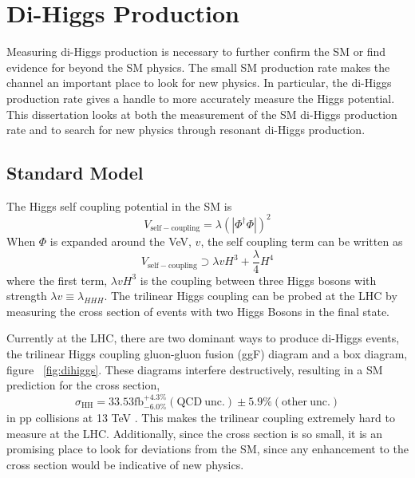\chapter{Di-Higgs Production}
\label{chap:dihiggs}
Measuring di-Higgs production is necessary to further confirm the SM or find evidence for beyond the SM physics. The small SM production rate makes the channel an important place to look for new physics.  In particular, the di-Higgs production rate gives a handle to more accurately measure the Higgs potential.  This dissertation looks at both the measurement of the SM di-Higgs production rate and to search for new physics through resonant di-Higgs production. 
\section{Standard Model}
The Higgs self coupling potential in the SM is
\begin{equation}
V_{\mathrm{self-coupling}} = \lambda(|\Phi^{\dagger}\Phi|)^{2}
\end{equation}
When ${\Phi}$ is expanded around the VeV, $v$, the self coupling term can be written as
\begin{equation}
V_{\mathrm{self-coupling}} \supset \lambda v H^{3} + \frac{\lambda}{4}H^{4}
\end{equation}
where the first term, ${\lambda v H^{3}}$ is the coupling between three Higgs bosons with strength ${\lambda v \equiv \lambda_{HHH}}$\cite{Belusevic:2004pz}. The trilinear Higgs coupling can be probed at the LHC by measuring the cross section of events with two Higgs Bosons in the final state.\newline



\indent  Currently at the LHC, there are two dominant ways to produce di-Higgs events, the trilinear Higgs coupling gluon-gluon fusion (ggF) diagram and a box diagram, figure ~\ref{fig:dihiggs}. These diagrams interfere destructively, resulting in a SM prediction for the cross section, 
\begin{equation}
\sigma_{\mathrm{HH}} = 33.53\mathrm{fb}^{+4.3\%}_{-6.0\%}(\mathrm{QCD \ unc.})\pm{5.9\%} \mathrm{(other \ unc.)} 
\end{equation}
in pp collisions at 13 TeV \cite{Sirunyan:2018two}. This makes the trilinear coupling extremely hard to measure at the LHC. Additionally, since the cross section is so small, it is an promising place to look for deviations from the SM, since any enhancement to the cross section would be indicative of new physics.

